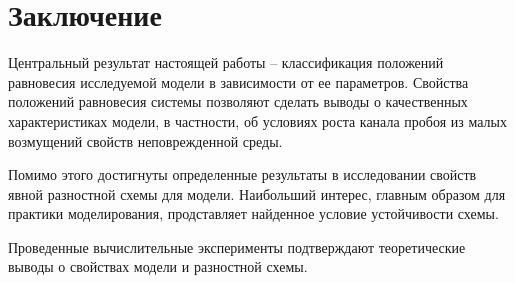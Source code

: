 
\section{Заключение}

Центральный результат настоящей работы -- классификация положений равновесия исследуемой модели в зависимости от ее параметров. Свойства положений равновесия системы позволяют сделать выводы о качественных характеристиках модели, в частности, об условиях роста канала пробоя из малых возмущений свойств неповрежденной среды.

Помимо этого достигнуты определенные результаты в исследовании \linebreak свойств явной разностной схемы для модели. Наибольший интерес, главным образом для практики моделирования, продставляет найденное условие устойчивости схемы.

Проведенные вычислительные эксперименты подтверждают теоретические выводы о свойствах модели и разностной схемы.